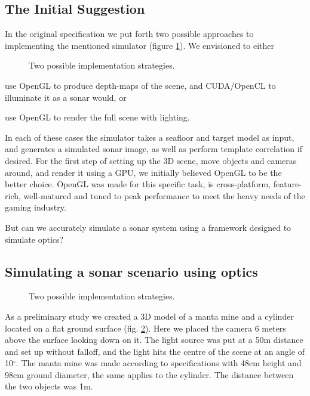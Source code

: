 \documentclass[
   article                                      %
 , 12pt                                         %
 , xelatex                                      %
 , bibtex                                       %
 , layout
]{common/mytemplate}
\begin{document}
\subsection{The Initial Suggestion}

In the original specification we put forth two possible approaches to implementing the mentioned simulator (figure \ref{implementation}). We envisioned to either

\begin{figure}[b]
\begin{narrow}{-2.3cm}{-2.3cm}
\end{narrow}
\caption{Two possible implementation strategies.}\label{implementation}
\end{figure}

\begin{itemize0}
\item use OpenGL to produce depth-maps of the scene, and CUDA/OpenCL to illuminate it as a sonar would, or
\item use OpenGL to render the full scene with lighting.
\end{itemize0}

In each of these cases the simulator takes a seafloor and target model as input, and generates a simulated sonar image, as well as perform template correlation if desired. For the first step of setting up the 3D scene, move objects and cameras around, and render it using a GPU, we initially believed OpenGL to be the better choice. OpenGL was made for this specific task, is cross-platform, feature-rich, well-matured and tuned to peak performance to meet the heavy needs of the gaming industry.

But can we accurately simulate a sonar system using a framework designed to simulate optics?


\subsection{Simulating a sonar scenario using optics}

\begin{figure}[b]
\begin{narrow}{-2.3cm}{-2.3cm}
\end{narrow}
\caption{Two possible implementation strategies.}\label{simulation_setup}
\end{figure}

As a preliminary study we created a 3D model of a manta mine and a cylinder located on a flat ground surface (fig. \ref{simulation_setup}). Here we placed the camera 6 meters above the surface looking down on it. The light source was put at a 50\;m distance and set up without falloff, and the light hits the centre of the scene at an angle of 10$^\circ$. The manta mine was made according to specifications with 48\;cm height and 98\;cm ground diameter, the same applies to the cylinder. The distance between the two objects was 1\;m.
\end{document}
